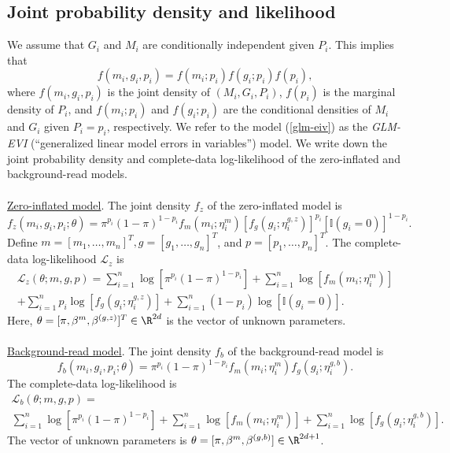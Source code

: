 \documentclass[12pt]{article}
\begin{document}
\subsection{Joint probability density and likelihood}
We assume that $G_i$ and $M_i$ are conditionally independent given $P_i$. This implies that \begin{equation}\label{glm-eiv} f(m_i, g_i, p_i) = f(m_i; p_i) f(g_i; p_i) f(p_i),\end{equation} where $f(m_i, g_i, p_i)$ is the joint density of $(M_i, G_i, P_i)$, $f(p_i)$ is the marginal density of $P_i$, and $f(m_i; p_i)$ and $f(g_i; p_i)$ are the conditional densities of $M_i$ and $G_i$ given $P_i = p_i$, respectively. We refer to the model (\ref{glm-eiv}) as the \textit{GLM-EVI} (``generalized linear model errors in variables'') model. We write down the joint probability density and complete-data log-likelihood of the zero-inflated and background-read models.
\\ \\ 
\underline{Zero-inflated model}. The joint density $f_{z}$ of the zero-inflated model is
\begin{equation}\label{zero_inf_model}
f_{z}(m_i, g_i, p_i; \theta) = \pi^{p_i}(1 - \pi)^{1 - p_i} f_m(m_i; \eta^m_i) \left[ f_g(g_i; \eta_i^{g,z}) \right]^{p_i} \left[ \mathbb{I}(g_i = 0) \right]^{1-p_i}.
\end{equation}
Define $m = [m_1, \dots, m_n]^T, g = [g_1, \dots, g_n]^T$, and $p = [p_1, \dots, p_n]^T$.
The complete-data log-likelihood $\mathcal{L}_z$ is
\begin{multline}\label{zero_inf_log_lik}
\mathcal{L}_z(\theta; m, g, p) = \sum_{i=1}^n \log \left[ \pi^{p_i} (1-\pi)^{1-p_i} \right] + \sum_{i=1}^n \log\left[ f_m(m_i; \eta^m_i) \right] \\ + \sum_{i=1}^n p_i \log \left[f_{g}(g_i; \eta_i^{g,z} ) \right] + \sum_{i=1}^n (1 - p_i)\log\left[ \mathbb{I}(g_i = 0) \right].
\end{multline}  Here, $\theta = [ \pi, \beta^m, \beta^{(g,z)} ]^T \in \R^{2d}$ is the vector of unknown parameters.
\\ \\ 
\underline{Background-read model}. The joint density $f_b$ of the background-read model is
\begin{equation}\label{background_read_model} f_b(m_i, g_i, p_i; \theta) =  \pi^{p_i}(1 - \pi)^{1 - p_i} f_m(m_i; \eta^m_i) f_g(g_i; \eta_i^{g,b}). \end{equation} The complete-data log-likelihood is
\begin{multline}\label{background_read_log_lik}
\mathcal{L}_b(\theta; m, g, p) =\\  \sum_{i=1}^n \log\left[ \pi^{p_i} (1 - \pi)^{1 - p_i} \right] + \sum_{i=1}^n \log \left[ f_m(m_i; \eta_i^m) \right] + \sum_{i=1}^n \log\left[ f_{g}(g_i; \eta_i^{g,b} ) \right].
\end{multline}
The vector of unknown parameters is $\theta = [ \pi, \beta^m, \beta^{(g,b)}] \in \R^{2d+1}$.
\end{document}
